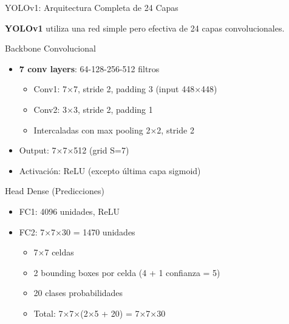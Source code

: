 \documentclass[aspectratio=169, 10pt]{beamer}
\begin{document}
\begin{frame}[shrink]{YOLOv1: Arquitectura Completa de 24 Capas}

	\textbf{YOLOv1} utiliza una red simple pero efectiva de 24 capas convolucionales.

	\vspace{0.2cm}

	\begin{block}{Backbone Convolucional}
		\small
		\begin{itemize}
			\item \textbf{7 conv layers}: 64-128-256-512 filtros
			\begin{itemize}
				\item Conv1: 7×7, stride 2, padding 3 (input 448×448)
				\item Conv2: 3×3, stride 2, padding 1
				\item Intercaladas con max pooling 2×2, stride 2
			\end{itemize}
			\item Output: 7×7×512 (grid S=7)
			\item Activaci\'on: ReLU (excepto \'ultima capa sigmoid)
		\end{itemize}
	\end{block}

	\vspace{0.2cm}

	\begin{block}{Head Dense (Predicciones)}
		\small
		\begin{itemize}
			\item FC1: 4096 unidades, ReLU
			\item FC2: 7×7×30 = 1470 unidades
			\begin{itemize}
				\item 7×7 celdas
				\item 2 bounding boxes por celda (4 + 1 confianza = 5)
				\item 20 clases probabilidades
				\item Total: 7×7×(2×5 + 20) = 7×7×30
			\end{itemize}
		\end{itemize}
	\end{block}

\end{frame}
\end{document}

